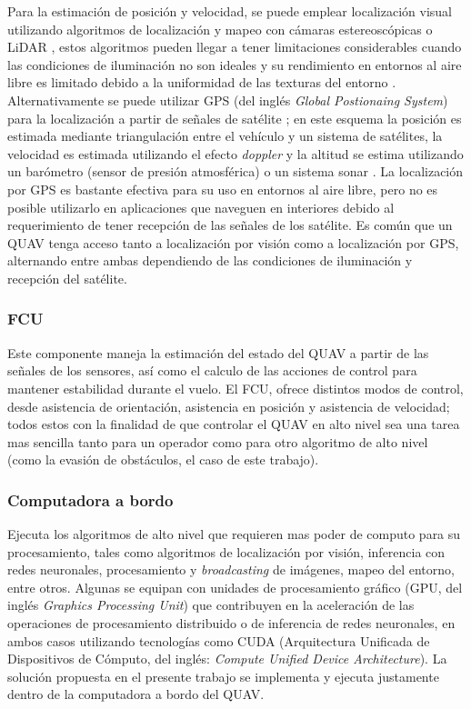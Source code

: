 Para la estimación de posición y velocidad, se puede emplear localización visual utilizando algoritmos de localización y mapeo con cámaras estereoscópicas o LiDAR \cite{multidrone2017review}, estos algoritmos pueden llegar a tener limitaciones considerables cuando las condiciones de iluminación no son ideales y su rendimiento en entornos al aire libre es limitado debido a la uniformidad de las texturas del entorno \cite{multidrone2017review}. Alternativamente se puede utilizar GPS (del inglés \textit{Global Postionaing System}) para la localización a partir de señales de satélite \cite{multidrone2017review}; en este esquema la posición es estimada mediante triangulación entre el vehículo y un sistema de satélites, la velocidad es estimada utilizando el efecto \textit{doppler} y la altitud se estima utilizando un barómetro (sensor de presión atmosférica) o un sistema sonar \cite{multidrone2017review}. La localización por GPS es bastante efectiva para su uso en entornos al aire libre, pero no es posible utilizarlo en aplicaciones que naveguen en interiores debido al requerimiento de tener recepción de las señales de los satélite. Es común que un QUAV tenga acceso tanto a localización por visión como a localización por GPS, alternando entre ambas dependiendo de las condiciones de iluminación y recepción del satélite.

\subsubsection{FCU}

Este componente maneja la estimación del estado del QUAV a partir de las señales de los sensores, así como el calculo de las acciones de control para mantener estabilidad durante el vuelo. El FCU, ofrece distintos modos de control, desde asistencia de orientación, asistencia en posición y asistencia de velocidad; todos estos con la finalidad de que controlar el QUAV en alto nivel sea una tarea mas sencilla tanto para un operador como para otro algoritmo de alto nivel (como la evasión de obstáculos, el caso de este trabajo). 

\subsubsection{Computadora a bordo}

Ejecuta los algoritmos de alto nivel que requieren mas poder de computo para su procesamiento, tales como algoritmos de localización por visión, inferencia con redes neuronales, procesamiento y \textit{broadcasting} de imágenes, mapeo del entorno, entre otros. Algunas se equipan con unidades de procesamiento gráfico (GPU, del inglés \textit{Graphics Processing Unit}) que contribuyen en la aceleración de las operaciones de procesamiento distribuido o de inferencia de redes neuronales, en ambos casos utilizando tecnologías como CUDA (Arquitectura Unificada de Dispositivos de Cómputo, del inglés: \textit{Compute Unified Device Architecture}). La solución propuesta en el presente trabajo se implementa y ejecuta justamente dentro de la computadora a bordo del QUAV.

